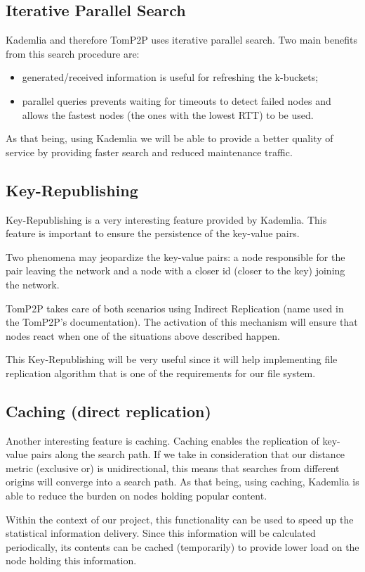 \documentclass[times,9pt,article]{llncs}
\begin{document}
\subsection{Iterative Parallel Search}
Kademlia and therefore TomP2P uses iterative parallel search. Two main benefits
from this search procedure are: 

\begin{itemize}
\item generated/received information is useful for refreshing the k-buckets;
\item parallel queries prevents waiting for timeouts to detect failed nodes and 
allows the fastest nodes (the ones with the lowest RTT) to be used. 
\end{itemize} 

As that being, using Kademlia we will be able to provide a better quality of
service by providing faster search and reduced maintenance traffic.

\subsection{Key-Republishing}
Key-Republishing is a very interesting feature provided by Kademlia. This feature
is important to ensure the persistence of the key-value pairs.

Two phenomena may jeopardize the key-value pairs: a node responsible for the pair
leaving the network and a node with a closer id (closer to the key) joining the
network. 

TomP2P takes care of both scenarios using Indirect Replication (name used in the
TomP2P's documentation). The activation of this mechanism will ensure that nodes
react when one of the situations above described happen. 

This Key-Republishing will be very useful since it will help implementing file
replication algorithm that is one of the requirements for our file system.   

\subsection{Caching (direct replication)}

Another interesting feature is caching. Caching enables the replication of 
key-value pairs along the search path. If we take in consideration that our 
distance metric (exclusive or) is unidirectional, this means that searches 
from different origins will converge into a search path. As that being, using
caching, Kademlia is able to reduce the burden on nodes holding popular content.

Within the context of our project, this functionality can be used to speed up
the statistical information delivery. Since this information will be calculated
periodically, its contents can be cached (temporarily) to provide lower load on
the node holding this information. 
\end{document}
